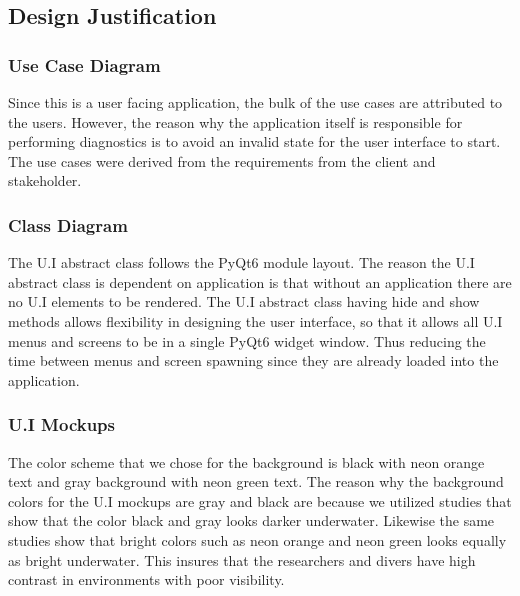 \subsection{Design Justification}
\subsubsection{Use Case Diagram}
Since this is a user facing application, the bulk of the use cases are attributed to the users. However, the reason why the application itself is responsible for performing diagnostics is to avoid an invalid state for the user interface to start. The use cases were derived from the requirements from the client and stakeholder.
\subsubsection{Class Diagram}
The U.I abstract class follows the PyQt6 module layout. The reason the U.I abstract class is dependent on application is that without an application there are no U.I elements to be rendered. The U.I abstract class having hide and show methods allows flexibility in designing the user interface, so that it allows all U.I menus and screens to be in a single PyQt6 widget window. Thus reducing the time between menus and screen spawning since they are already loaded into the application.
\subsubsection{U.I Mockups}
The color scheme that we chose for the background is black with neon orange text and gray background with neon green text. The reason why the background colors for the U.I mockups are gray and black are because we utilized studies that show that the color black and gray looks darker underwater.\cite{AquaticSafetyGroup2021}\cite{FluoGreenMost2018} Likewise the same studies show that bright colors such as neon orange and neon green looks equally as bright underwater.\cite{AquaticSafetyGroup2021}\cite{FluoGreenMost2018} This insures that the researchers and divers have high contrast in environments with poor visibility.
